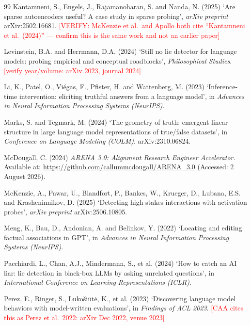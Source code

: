 \documentclass[conference]{IEEEtran}
\begin{document}
\begin{thebibliography}{99}
Kantamneni, S., Engels, J., Rajamanoharan, S. and Nanda, N. (2025) `Are sparse
autoencoders useful? A case study in sparse probing', \textit{arXiv preprint}
arXiv:2502.16681. \textcolor{red}{[VERIFY: McKenzie et al.\ and Apollo both cite
``Kantamneni et al.\ (2024)'' --- confirm this is the same work and not an earlier paper]}

Levinstein, B.A. and Herrmann, D.A. (2024) `Still no lie detector for language
models: probing empirical and conceptual roadblocks',
\textit{Philosophical Studies}. \textcolor{red}{[verify year/volume: arXiv 2023, journal 2024]}

Li, K., Patel, O., Vi\'egas, F., Pfister, H. and Wattenberg, M. (2023)
`Inference-time intervention: eliciting truthful answers from a language model',
in \textit{Advances in Neural Information Processing Systems (NeurIPS)}.

Marks, S. and Tegmark, M. (2024) `The geometry of truth: emergent linear
structure in large language model representations of true/false datasets', in
\textit{Conference on Language Modeling (COLM)}. arXiv:2310.06824.

McDougall, C. (2024) \textit{ARENA 3.0: Alignment Research Engineer
Accelerator}. Available at: \url{https://github.com/callummcdougall/ARENA_3.0}
(Accessed: 2 August 2026).

McKenzie, A., Pawar, U., Blandfort, P., Bankes, W., Krueger, D., Lubana, E.S.
and Krasheninnikov, D. (2025) `Detecting high-stakes interactions with
activation probes', \textit{arXiv preprint} arXiv:2506.10805.

Meng, K., Bau, D., Andonian, A. and Belinkov, Y. (2022) `Locating and editing
factual associations in GPT', in \textit{Advances in Neural Information
Processing Systems (NeurIPS)}.

Pacchiardi, L., Chan, A.J., Mindermann, S., et al. (2024) `How to catch an AI
liar: lie detection in black-box LLMs by asking unrelated questions', in
\textit{International Conference on Learning Representations (ICLR)}.

Perez, E., Ringer, S., Luko\v{s}i\=ut\.e, K., et al. (2023) `Discovering language
model behaviors with model-written evaluations', in \textit{Findings of ACL 2023}.
\textcolor{red}{[CAA cites this as Perez et al.\ 2022: arXiv Dec 2022, venue 2023]}


\end{thebibliography}
\end{document}
